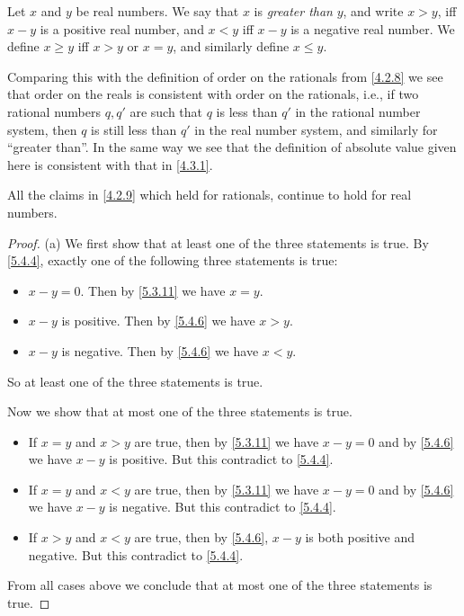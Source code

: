 \begin{defn}\label{5.4.6}
	Let \(x\) and \(y\) be real numbers.
	We say that \(x\) is \emph{greater than} \(y\), and write \(x > y\), iff \(x - y\) is a positive real number, and \(x < y\) iff \(x - y\) is a negative real number.
	We define \(x \geq y\) iff \(x > y\) or \(x = y\), and similarly define \(x \leq y\).
\end{defn}

\begin{note}
	Comparing this with the definition of order on the rationals from \cref{4.2.8} we see that order on the reals is consistent with order on the rationals, i.e., if two rational numbers \(q, q'\) are such that \(q\) is less than \(q'\) in the rational number system, then \(q\) is still less than \(q'\) in the real number system, and similarly for ``greater than''.
	In the same way we see that the definition of absolute value given here is consistent with that in \cref{4.3.1}.
\end{note}

\begin{prop}\label{5.4.7}
	All the claims in \cref{4.2.9} which held for rationals, continue to hold for real numbers.
\end{prop}

\begin{proof}{(a)}
	We first show that at least one of the three statements is true.
	By \cref{5.4.4}, exactly one of the following three statements is true:
	\begin{itemize}
		\item \(x - y = 0\).
		      Then by \cref{5.3.11} we have \(x = y\).
		\item \(x - y\) is positive.
		      Then by \cref{5.4.6} we have \(x > y\).
		\item \(x - y\) is negative.
		      Then by \cref{5.4.6} we have \(x < y\).
	\end{itemize}
	So at least one of the three statements is true.

	Now we show that at most one of the three statements is true.
	\begin{itemize}
		\item If \(x = y\) and \(x > y\) are true, then by \cref{5.3.11} we have \(x - y = 0\) and by \cref{5.4.6} we have \(x - y\) is positive.
		      But this contradict to \cref{5.4.4}.
		\item If \(x = y\) and \(x < y\) are true, then by \cref{5.3.11} we have \(x - y = 0\) and by \cref{5.4.6} we have \(x - y\) is negative.
		      But this contradict to \cref{5.4.4}.
		\item If \(x > y\) and \(x < y\) are true, then by \cref{5.4.6}, \(x - y\) is both positive and negative.
		      But this contradict to \cref{5.4.4}.
	\end{itemize}
	From all cases above we conclude that at most one of the three statements is true.
\end{proof}

